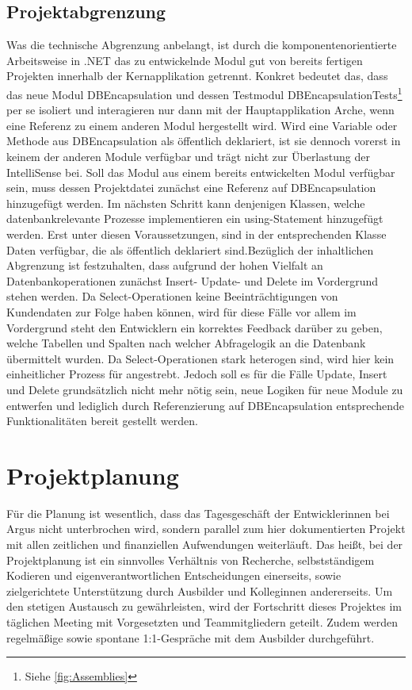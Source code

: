 \documentclass[11pt,toc=sectionentrywithoutdots, 
headheight=44pt, headings=optiontoheadandtoc, hyperfootnotes=false, hypertexnames=false]{scrartcl}
\newcommand\extendedref[1]{Siehe \ref{#1}}
\begin{document}
\subsection{Projektabgrenzung}
Was die technische Abgrenzung anbelangt, ist durch die komponentenorientierte Arbeitsweise in .NET das zu entwickelnde Modul gut von bereits fertigen Projekten innerhalb der Kernapplikation getrennt. Konkret bedeutet das, dass das neue Modul \glqq DBEncapsulation\grqq{} und dessen Testmodul \glqq DBEncapsulationTests\grqq{}\footnote{\extendedref{fig:Assemblies}} per se isoliert und interagieren nur dann mit der Hauptapplikation Arche, wenn eine Referenz zu einem anderen Modul hergestellt wird. Wird eine Variable oder Methode aus DBEncapsulation als öffentlich deklariert, ist sie dennoch vorerst in keinem der anderen Module verfügbar und trägt nicht zur Überlastung der \gls{IntelliSense} bei. Soll das Modul aus einem bereits entwickelten Modul verfügbar sein, muss dessen Projektdatei zunächst eine Referenz auf DBEncapsulation hinzugefügt werden. Im nächsten Schritt kann denjenigen Klassen, welche datenbankrelevante Prozesse implementieren ein \glqq using\grqq{}-Statement hinzugefügt werden. Erst unter diesen Voraussetzungen, sind in der entsprechenden Klasse Daten verfügbar, die als öffentlich deklariert sind.\newline Bezüglich der inhaltlichen Abgrenzung ist festzuhalten, dass aufgrund der hohen Vielfalt an Datenbankoperationen zunächst Insert- Update- und Delete im Vordergrund stehen werden. Da Select-Operationen keine Beeinträchtigungen von Kundendaten zur Folge haben können, wird für diese Fälle vor allem im Vordergrund steht den Entwicklern ein korrektes Feedback darüber zu geben, welche Tabellen und Spalten nach welcher Abfragelogik an die Datenbank übermittelt wurden. Da Select-Operationen stark heterogen sind, wird hier kein einheitlicher Prozess für angestrebt. Jedoch soll es für die Fälle Update, Insert und Delete grundsätzlich nicht mehr nötig sein, neue Logiken für neue Module zu entwerfen und lediglich durch Referenzierung auf DBEncapsulation entsprechende Funktionalitäten bereit gestellt werden.

\section{Projektplanung}
Für die Planung ist wesentlich, dass das Tagesgeschäft der Entwicklerinnen bei Argus nicht unterbrochen wird, sondern parallel zum hier dokumentierten Projekt mit allen zeitlichen und finanziellen Aufwendungen weiterläuft. Das heißt, bei der Projektplanung ist ein sinnvolles Verhältnis von Recherche, selbstständigem Kodieren und eigenverantwortlichen Entscheidungen einerseits, sowie zielgerichtete Unterstützung durch Ausbilder und Kolleginnen andererseits. Um den stetigen Austausch zu gewährleisten, wird der Fortschritt dieses Projektes im täglichen Meeting mit Vorgesetzten und Teammitgliedern geteilt. Zudem werden regelmäßige sowie spontane 1:1-Gespräche mit dem Ausbilder durchgeführt.
\end{document}
